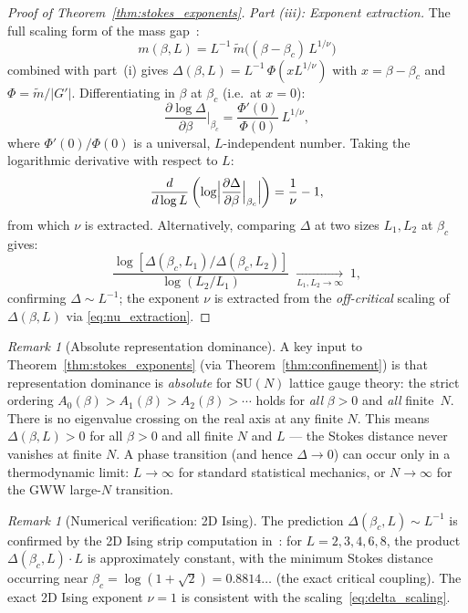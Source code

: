 \documentclass[12pt]{article}
\theoremstyle{definition}
\theoremstyle{remark}
\newtheorem{remark}[theorem]{Remark}
\newcommand{\SU}{\mathrm{SU}}
\begin{document}
\begin{proof}[Proof of Theorem~\ref{thm:stokes_exponents}]
\emph{Part (iii): Exponent extraction.}
The full scaling form of the mass
gap~\cite{Fisher72,Barber83}:
\begin{equation}
m(\beta, L) = L^{-1}\,\tilde{m}\bigl((\beta - \beta_c)\,L^{1/\nu}\bigr)
\end{equation}
combined with part~(i) gives $\Delta(\beta, L) = L^{-1}\,\Phi(x L^{1/\nu})$
with $x = \beta - \beta_c$ and $\Phi = \tilde{m}/|G'|$.
Differentiating in $\beta$ at $\beta_c$ (i.e.\ at $x = 0$):
\[
\frac{\partial\log\Delta}{\partial\beta}\bigg|_{\beta_c}
= \frac{\Phi'(0)}{\Phi(0)}\,L^{1/\nu},
\]
where $\Phi'(0)/\Phi(0)$ is a universal, $L$-independent number.
Taking the logarithmic derivative with respect to $L$:
\[
\frac{d}{d\log L}\left(
\log\Bigl|\frac{\partial\Delta}{\partial\beta}\Big|_{\beta_c}\Bigr|
\right)
= \frac{1}{\nu} - 1,
\]
from which $\nu$ is extracted.  Alternatively, comparing $\Delta$
at two sizes $L_1, L_2$ at $\beta_c$ gives:
\begin{equation}\label{eq:nu_ratio}
\frac{\log[\Delta(\beta_c,L_1)/\Delta(\beta_c,L_2)]}{\log(L_2/L_1)}
\;\xrightarrow[L_1,L_2\to\infty]{}\; 1,
\end{equation}
confirming $\Delta \sim L^{-1}$; the exponent $\nu$ is extracted
from the \emph{off-critical} scaling of $\Delta(\beta, L)$ via
\eqref{eq:nu_extraction}.
\end{proof}

\begin{remark}[Absolute representation dominance]
\label{rem:absolute_dominance}
A key input to Theorem~\ref{thm:stokes_exponents} (via
Theorem~\ref{thm:confinement}) is that representation dominance is
\emph{absolute} for $\SU(N)$ lattice gauge theory: the strict
ordering $A_0(\beta) > A_1(\beta) > A_2(\beta) > \cdots$ holds for
\emph{all} $\beta > 0$ and \emph{all} finite~$N$.  There is no
eigenvalue crossing on the real axis at any finite $N$.  This means
$\Delta(\beta, L) > 0$ for all $\beta > 0$ and all finite $N$ and
$L$ --- the Stokes distance never vanishes at finite $N$.  A phase
transition (and hence $\Delta \to 0$) can occur only in a
thermodynamic limit: $L \to \infty$ for standard statistical
mechanics, or $N \to \infty$ for the GWW large-$N$ transition.
\end{remark}

\begin{remark}[Numerical verification: 2D Ising]
\label{rem:ising_verification}
The prediction $\Delta(\beta_c, L) \sim L^{-1}$ is confirmed by
the 2D Ising strip computation in~\cite{OlbrykPsi2026}: for
$L = 2, 3, 4, 6, 8$, the product $\Delta(\beta_c, L) \cdot L$
is approximately constant, with the minimum Stokes distance
occurring near $\beta_c = \log(1 + \sqrt{2}) = 0.8814\ldots$
(the exact critical coupling).  The exact 2D Ising exponent
$\nu = 1$ is consistent with the scaling~\eqref{eq:delta_scaling}.
\end{remark}
\end{document}
